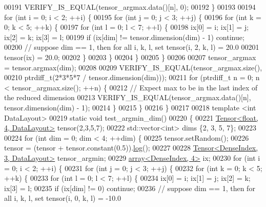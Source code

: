 \begin{DoxyCode}
00191       VERIFY\_IS\_EQUAL(tensor\_argmax.data()[n], 0);
00192     \}
00193 
00194     \textcolor{keywordflow}{for} (\textcolor{keywordtype}{int} i = 0; i < 2; ++i) \{
00195       \textcolor{keywordflow}{for} (\textcolor{keywordtype}{int} j = 0; j < 3; ++j) \{
00196         \textcolor{keywordflow}{for} (\textcolor{keywordtype}{int} k = 0; k < 5; ++k) \{
00197           \textcolor{keywordflow}{for} (\textcolor{keywordtype}{int} l = 0; l < 7; ++l) \{
00198             ix[0] = i; ix[1] = j; ix[2] = k; ix[3] = l;
00199             \textcolor{keywordflow}{if} (ix[dim] != tensor.dimension(dim) - 1) \textcolor{keywordflow}{continue};
00200             \textcolor{comment}{// suppose dim == 1, then for all i, k, l, set tensor(i, 2, k, l) = 20.0}
00201             tensor(ix) = 20.0;
00202           \}
00203         \}
00204       \}
00205     \}
00206 
00207     tensor\_argmax = tensor.argmax(dim);
00208 
00209     VERIFY\_IS\_EQUAL(tensor\_argmax.size(),
00210                     ptrdiff\_t(2*3*5*7 / tensor.dimension(dim)));
00211     \textcolor{keywordflow}{for} (ptrdiff\_t n = 0; n < tensor\_argmax.size(); ++n) \{
00212       \textcolor{comment}{// Expect max to be in the last index of the reduced dimension}
00213       VERIFY\_IS\_EQUAL(tensor\_argmax.data()[n], tensor.dimension(dim) - 1);
00214     \}
00215   \}
00216 \}
00217 
00218 \textcolor{keyword}{template} <\textcolor{keywordtype}{int} DataLayout>
00219 \textcolor{keyword}{static} \textcolor{keywordtype}{void} test\_argmin\_dim()
00220 \{
00221   \hyperlink{class_eigen_1_1_tensor}{Tensor<float, 4, DataLayout>} tensor(2,3,5,7);
00222   std::vector<int> dims \{2, 3, 5, 7\};
00223 
00224   \textcolor{keywordflow}{for} (\textcolor{keywordtype}{int} dim = 0; dim < 4; ++dim) \{
00225     tensor.setRandom();
00226     tensor = (tensor + tensor.constant(0.5)).\hyperlink{structlog}{log}();
00227 
00228     \hyperlink{class_eigen_1_1_tensor}{Tensor<DenseIndex, 3, DataLayout>} tensor\_argmin;
00229     \hyperlink{class_eigen_1_1array}{array<DenseIndex, 4>} ix;
00230     \textcolor{keywordflow}{for} (\textcolor{keywordtype}{int} i = 0; i < 2; ++i) \{
00231       \textcolor{keywordflow}{for} (\textcolor{keywordtype}{int} j = 0; j < 3; ++j) \{
00232         \textcolor{keywordflow}{for} (\textcolor{keywordtype}{int} k = 0; k < 5; ++k) \{
00233           \textcolor{keywordflow}{for} (\textcolor{keywordtype}{int} l = 0; l < 7; ++l) \{
00234             ix[0] = i; ix[1] = j; ix[2] = k; ix[3] = l;
00235             \textcolor{keywordflow}{if} (ix[dim] != 0) \textcolor{keywordflow}{continue};
00236             \textcolor{comment}{// suppose dim == 1, then for all i, k, l, set tensor(i, 0, k, l) = -10.0}

\end{DoxyCode}
